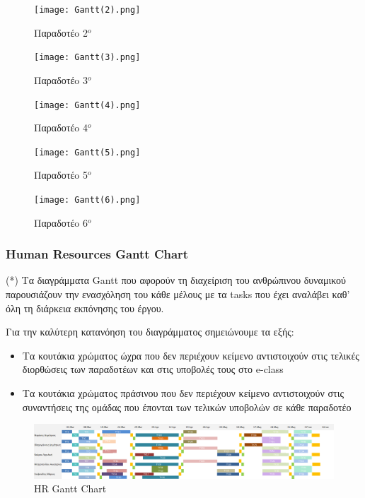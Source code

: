 \documentclass{article}
\begin{document}
\begin{figure}[!htb]
\centering
\texttt{[image: Gantt(2).png]}
\caption{\label{fig:Gantt2} Παραδοτέo 2$^o$}
\end{figure}

\begin{figure}[!htb]
\centering
\texttt{[image: Gantt(3).png]}
\caption{\label{fig:Gannt3} Παραδοτέo 3$^o$}
\end{figure}

\begin{figure}[!htb]
\centering
\texttt{[image: Gantt(4).png]}
\caption{\label{fig:Gannt4} Παραδοτέo 4$^o$}
\end{figure}

\newpage

\begin{figure}[!htb]
\centering
\texttt{[image: Gantt(5).png]}
\caption{\label{fig:Gannt5} Παραδοτέo 5$^o$}
\end{figure}

\vspace{0.3cm}

\begin{figure}[!htb]
\centering
\texttt{[image: Gantt(6).png]}
\caption{\label{fig:Gannt6} Παραδοτέo 6$^o$}
\end{figure}

\subsubsection{Human Resources Gantt Chart}

(*) Τα διαγράμματα Gantt που αφορούν τη διαχείριση του ανθρώπινου δυναμικού παρουσιάζουν την ενασχόληση του κάθε μέλους με τα tasks που έχει αναλάβει καθ' όλη τη διάρκεια εκπόνησης του έργου.

Για την καλύτερη κατανόηση του διαγράμματος σημειώνουμε τα εξής:
\begin{itemize}
    \item Τα κουτάκια χρώματος ώχρα που δεν περιέχουν κείμενο αντιστοιχούν στις τελικές διορθώσεις των παραδοτέων και στις υποβολές τους στο e-class
    \item Τα κουτάκια χρώματος πράσινου που δεν περιέχουν κείμενο αντιστοιχούν στις συναντήσεις της ομάδας που έπονται των τελικών υποβολών σε κάθε παραδοτέο
\end{itemize}

\begin{figure}[!htb]
\centering
\includegraphics[width=1.0\textwidth]{HR Gantt Team Plan (Sceen).png}
\caption{\label{fig:HRGantt} HR Gantt Chart }
\end{figure}
\end{document}
